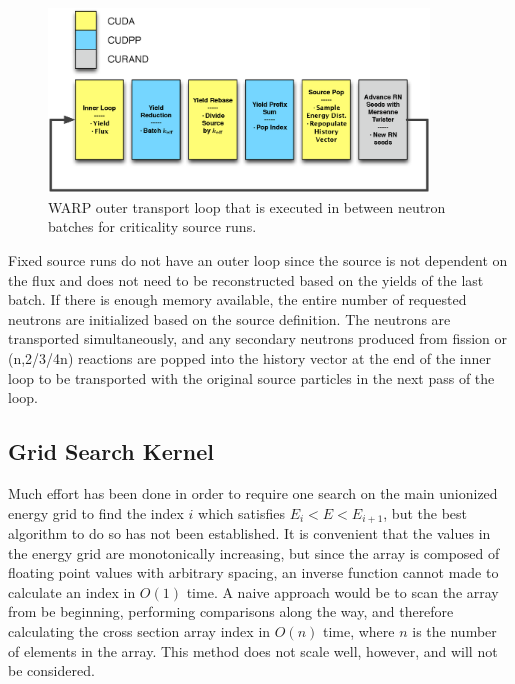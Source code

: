 \begin{figure}[h!] 
\centering
\includegraphics[width=0.9\textwidth]{graphics/warp_outer_loop.eps}
\caption{WARP outer transport loop that is executed in between neutron batches for criticality source runs. \label{warp_outer_loop} }
\end{figure}

Fixed source runs do not have an outer loop since the source is not dependent on the flux and does not need to be reconstructed based on the yields of the last batch.  If there is enough memory available, the entire number of requested neutrons are initialized based on the source definition.  The neutrons are transported simultaneously, and any secondary neutrons produced from fission or (n,2/3/4n) reactions are popped into the history vector at the end of the inner loop to be transported with the original source particles in the next pass of the loop.

\subsection{Grid Search Kernel}

Much effort has been done in order to require one search on the main unionized energy grid to find the index $i$ which satisfies $E_i<E<E_{i+1}$, but the best algorithm to do so has not been established.  It is convenient that the values in the energy grid are monotonically increasing, but since the array is composed of floating point values with arbitrary spacing, an inverse function cannot made to calculate an index in $O(1)$ time.   A naive approach would be to scan the array from be beginning, performing comparisons along the way, and therefore calculating the cross section array index in $O(n)$ time, where $n$ is the number of elements in the array.  This method does not scale well, however, and will not be considered.  


